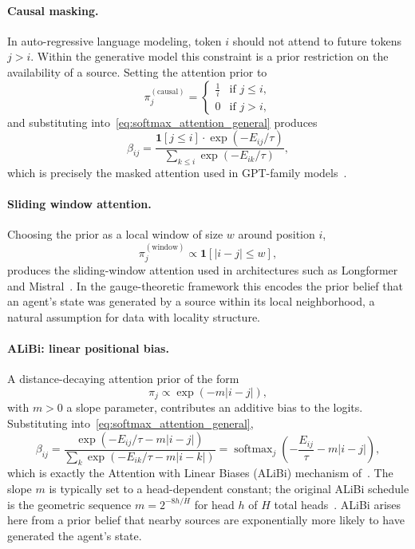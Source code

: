 \documentclass[11pt]{article}
\begin{document}
\paragraph{Causal masking.}
In auto-regressive language modeling, token $i$ should not attend to future tokens $j > i$. Within the generative model this constraint is a prior restriction on the availability of a source. Setting the attention prior to
\begin{equation}
\pi_j^{(\text{causal})} = \begin{cases} \frac{1}{i} & \text{if } j \leq i, \\ 0 & \text{if } j > i, \end{cases}
\label{eq:causal_prior}
\end{equation}
and substituting into~\eqref{eq:softmax_attention_general} produces
\begin{equation}
\beta_{ij} = \frac{\mathbf{1}[j \leq i] \cdot \exp(-E_{ij}/\tau)}{\sum_{k \leq i} \exp(-E_{ik}/\tau)},
\label{eq:causal_attention}
\end{equation}
which is precisely the masked attention used in GPT-family models~\cite{radford2019language}.

\paragraph{Sliding window attention.}
Choosing the prior as a local window of size $w$ around position $i$,
\begin{equation}
\pi_j^{(\text{window})} \propto \mathbf{1}[|i - j| \leq w],
\label{eq:window_prior}
\end{equation}
produces the sliding-window attention used in architectures such as Longformer~\cite{beltagy2020longformer} and Mistral~\cite{jiang2023mistral}. In the gauge-theoretic framework this encodes the prior belief that an agent's state was generated by a source within its local neighborhood, a natural assumption for data with locality structure.

\paragraph{ALiBi: linear positional bias.}
A distance-decaying attention prior of the form
\begin{equation}
\pi_j \propto \exp(-m|i - j|),
\label{eq:alibi_prior}
\end{equation}
with $m > 0$ a slope parameter, contributes an additive bias to the logits. Substituting into~\eqref{eq:softmax_attention_general},
\begin{equation}
\beta_{ij} = \frac{\exp(-E_{ij}/\tau - m|i-j|)}{\sum_k \exp(-E_{ik}/\tau - m|i-k|)} = \operatorname{softmax}_j\left(-\frac{E_{ij}}{\tau} - m|i - j|\right),
\label{eq:alibi_attention}
\end{equation}
which is exactly the Attention with Linear Biases (ALiBi) mechanism of~\cite{press2022train}. The slope $m$ is typically set to a head-dependent constant; the original ALiBi schedule is the geometric sequence $m = 2^{-8h/H}$ for head $h$ of $H$ total heads~\cite{press2022train}. ALiBi arises here from a prior belief that nearby sources are exponentially more likely to have generated the agent's state.
\end{document}
